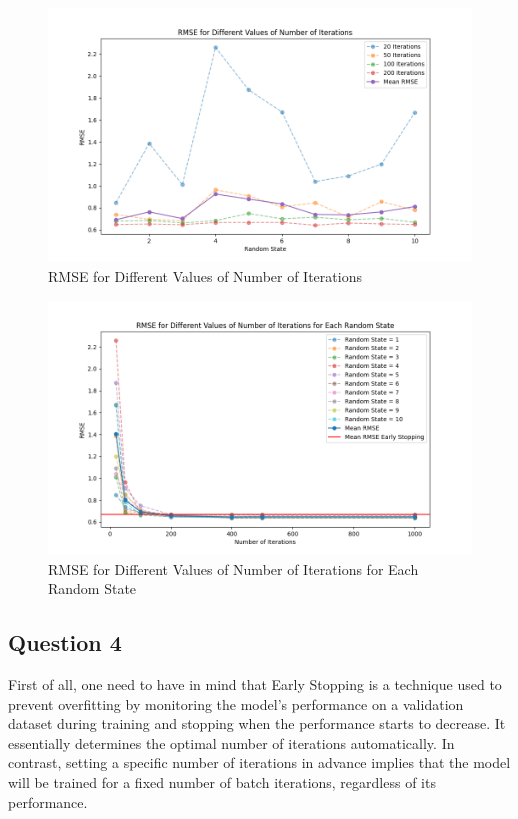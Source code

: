\documentclass{article}
\begin{document}
\begin{figure}[H]
    \includegraphics*[width=\linewidth]{images/rmse.png}
    \caption{RMSE for Different Values of Number of Iterations}
\end{figure}

\begin{figure}[H]
    \includegraphics*[width=\linewidth]{images/rmse_iterations_random_state.png}
    \caption{RMSE for Different Values of Number of Iterations for Each Random State}
\end{figure}

\subsection*{Question 4}

First of all, one need to have in mind that Early Stopping is a technique used to prevent overfitting by monitoring the model's performance on a validation dataset during training and stopping when the performance starts to decrease. It essentially determines the optimal number of iterations automatically. In contrast, setting a specific number of iterations in advance implies that the model will be trained for a fixed number of batch iterations, regardless of its performance.
\end{document}
